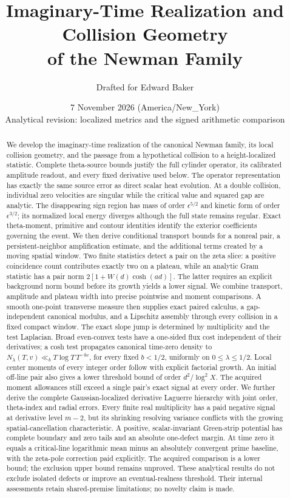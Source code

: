 \documentclass[11pt]{article}
\title{Imaginary-Time Realization and Collision Geometry\\of the Newman Family}
\author{Drafted for Edward Baker}
\date{7 November 2026 (America/New\_York)\\\small Analytical revision: localized metrics and the signed arithmetic comparison}
\theoremstyle{definition}
\theoremstyle{remark}
\numberwithin{equation}{section}
\begin{document}
\maketitle
\begin{abstract}
We develop the imaginary-time realization of the canonical Newman family,
its local collision geometry, and the passage from a hypothetical
collision to a height-localized statistic. Complete theta-source bounds
justify the full cylinder operator, its calibrated amplitude readout,
and every fixed derivative used below. The operator representation has
exactly the same source error as direct scalar heat evolution.
At a double collision, individual zero velocities are singular while the
critical value and squared gap are analytic. The disappearing sign
region has mass of order \(\epsilon^{5/2}\) and kinetic form of order
\(\epsilon^{3/2}\); its normalized local energy diverges although the
full state remains regular. Exact theta-moment, primitive and contour
identities identify the exterior coefficients governing the event.
We then derive conditional transport bounds for a nonreal pair, a
persistent-neighbor amplification estimate, and the additional terms
created by a moving spatial window. Two finite statistics detect a pair
on the zeta slice: a positive coincidence count contributes exactly two
on a plateau, while an analytic Gram statistic has a pair norm
\(2[1+W(d)\cosh(ad)]\). The latter requires an explicit background
norm bound before its growth yields a lower signal. We combine transport,
amplitude and plateau width into precise pointwise and moment comparisons.
A smooth one-point transverse measure then supplies exact paired
calculus, a gap-independent canonical modulus, and a Lipschitz assembly
through every collision in a fixed compact window. The exact slope jump
is determined by multiplicity and the test Laplacian. Broad even-convex
tests have a one-sided flux cost independent of their derivatives; a cosh
test propagates canonical time-zero density to
\(N_\lambda(T,v)\ll_b T\log T\,T^{-bv}\), for every fixed \(b<1/2\),
uniformly on \(0\le\lambda\le1/2\). Local center moments of every
integer order follow with explicit factorial growth. An initial off-line
pair also gives a lower threshold bound of order \(d^2/\log^2 X\).
The acquired moment allowances still exceed a single pair's exact signal
at every order. We further derive the complete Gaussian-localized
derivative Laguerre hierarchy with joint order, theta-index and radial
errors. Every finite real multiplicity has a paid negative signal at
derivative level \(m-2\), but its shrinking resolving variance conflicts
with the growing spatial-cancellation characteristic. A positive,
scalar-invariant Green-strip potential has complete boundary and zero
tails and an absolute one-defect margin. At time zero it equals a
critical-line logarithmic mean minus an absolutely convergent prime
baseline, with the zeta-pole correction paid explicitly. The acquired
comparison is a lower bound; the exclusion upper bound remains unproved.
These analytical results do not exclude isolated defects or improve an
eventual-realness threshold. Their internal assessments retain
shared-premise limitations; no novelty claim is made.
\end{abstract}
\end{document}
